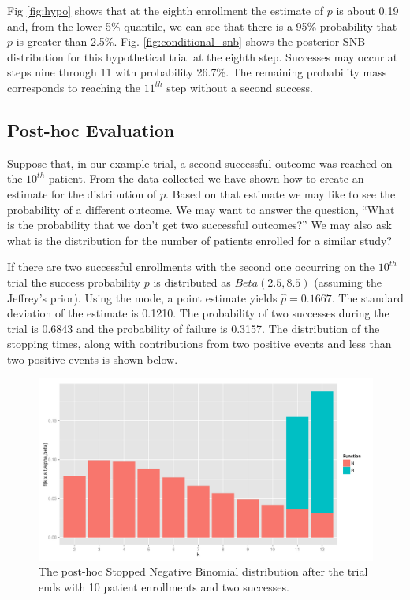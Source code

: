 \documentclass[12pt]{article}         %
\begin{document}
Fig \ref{fig:hypo} shows that at the eighth enrollment the estimate of $p$ is 
about 0.19 and, from the lower 5\% quantile, we can see that there is
a 95\% probability that $p$ is greater than 2.5\%. 
Fig. \ref{fig:conditional_snb} shows the posterior SNB distribution for this 
hypothetical trial at the eighth step.  Successes may occur 
at steps nine through 11 with probability 26.7\%. The remaining probability
mass corresponds to reaching the $11^{th}$ step without a second success.

\subsection{Post-hoc Evaluation}

Suppose that, in our example trial, a second successful outcome was reached 
on the $10^{th}$ patient. From the data collected we have shown how to create 
an estimate for the distribution of $p$. Based on that estimate we may like to 
see the probability of a different outcome. We may want to answer the
question, ``What is the probability that we don't get two successful outcomes?''
We may also ask what is the distribution for the number of patients 
enrolled for a similar study?

If there are two successful enrollments with the second one occurring 
on the $10^{th}$ trial the success probability $p$ is distributed as 
$Beta(2.5, 8.5)$ (assuming the Jeffrey's prior). 
Using the mode, a point estimate yields $\hat{p} = 0.1667$. The standard 
deviation of the estimate is 0.1210. The probability of two successes during 
the trial is 0.6843 and the probability of failure is 0.3157. The distribution 
of the stopping times, along with contributions from two positive events and 
less than two positive events is shown below.

\begin{figure}[ht]
\includegraphics[width=\textwidth]{post_hoc.pdf}
\caption{
The post-hoc Stopped Negative Binomial distribution after the trial ends with 10 patient enrollments and two successes.
}
\label{fig:post_hoc}
\end{figure}
\end{document}
